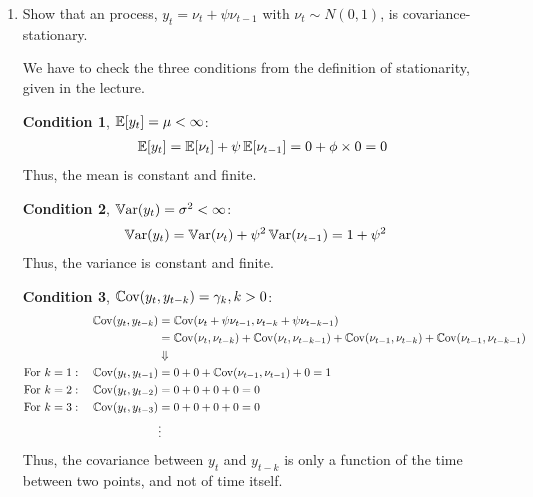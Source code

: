 \begin{enumerate}
    \item Show that an \maq[1]{} process, $y_t = \nu_t + \psi \nu_{t-1}$ with $\nu_t \sim N(0, 1)$, is covariance-stationary.

          \begin{sol}
              We have to check the three conditions from the definition of stationarity, given in the lecture.

              \textbf{Condition 1}, $\operatorname*{\mathbb{E}}[y_t] = \mu < \infty$:
              \begin{align*}
                  \operatorname*{\mathbb{E}}[y_t] = \operatorname*{\mathbb{E}}[\nu_t] + \psi \operatorname*{\mathbb{E}}[\nu_{t-1}]
                  = 0 + \phi \times 0
                  = 0
              \end{align*}
              Thus, the mean is constant and finite.

              \textbf{Condition 2}, $\operatorname*{\mathbb{V}ar}(y_t) = \sigma^2 < \infty$:
              \begin{align*}
                  \operatorname*{\mathbb{V}ar}(y_t)
                   & = \operatorname*{\mathbb{V}ar}(\nu_t) + \psi^2 \operatorname*{\mathbb{V}ar}(\nu_{t-1})
                  = 1 + \psi^2
              \end{align*}
              Thus, the variance is constant and finite.

              \textbf{Condition 3}, $\operatorname*{\mathbb{C}ov}(y_t, y_{t-k}) = \gamma_k, k>0$:
              \begin{align*}
                  \operatorname*{\mathbb{C}ov}(y_t, y_{t-k})
                   & = \operatorname*{\mathbb{C}ov}(\nu_t + \psi \nu_{t-1}, \nu_{t-k} + \psi \nu_{t-k-1})
                  \\
                   & = \operatorname*{\mathbb{C}ov}(\nu_t, \nu_{t-k})
                  + \operatorname*{\mathbb{C}ov}(\nu_t, \nu_{t-k-1})
                  + \operatorname*{\mathbb{C}ov}(\nu_{t-1}, \nu_{t-k})
                  + \operatorname*{\mathbb{C}ov}(\nu_{t-1}, \nu_{t-k-1})
                  \\
                   & \Downarrow
                  \\
                  \text{For $k=1$}: \quad \operatorname*{\mathbb{C}ov}(y_t, y_{t-1})
                   & = 0 + 0 + \operatorname*{\mathbb{C}ov}(\nu_{t-1}, \nu_{t-1}) + 0 = 1
                  \\
                  \text{For $k=2$}: \quad \operatorname*{\mathbb{C}ov}(y_t, y_{t-2})
                   & = 0 + 0 + 0 + 0 = 0
                  \\
                  \text{For $k=3$}: \quad \operatorname*{\mathbb{C}ov}(y_t, y_{t-3})
                   & = 0 + 0 + 0 + 0 = 0
                  \\
                   & \vdots
              \end{align*}
              Thus, the covariance between $y_t$ and $y_{t-k}$ is only a function of the time between two points, and not of time itself.
          \end{sol}


\end{enumerate}
